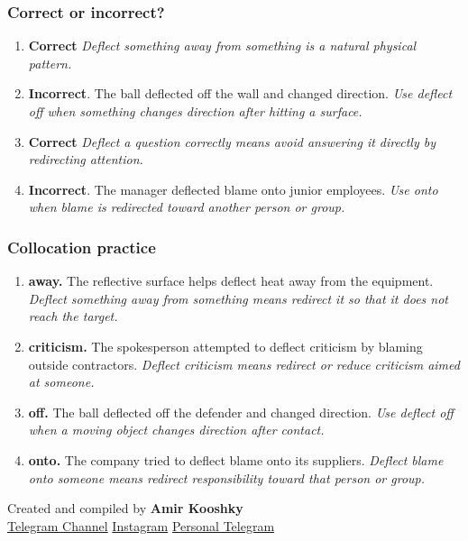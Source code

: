 \documentclass[11pt]{article}
\begin{document}
\subsubsection{Correct or incorrect?}
\begin{enumerate}
  \item \textbf{Correct} \emph{Deflect something away from something is a natural physical pattern.}
  \item \textbf{Incorrect}. The ball deflected off the wall and changed direction. \emph{Use deflect off when something changes direction after hitting a surface.}
  \item \textbf{Correct} \emph{Deflect a question correctly means avoid answering it directly by redirecting attention.}
  \item \textbf{Incorrect}. The manager deflected blame onto junior employees. \emph{Use onto when blame is redirected toward another person or group.}
\end{enumerate}

\subsubsection{Collocation practice}
\begin{enumerate}
  \item \textbf{away.} The reflective surface helps deflect heat away from the equipment. \emph{Deflect something away from something means redirect it so that it does not reach the target.}
  \item \textbf{criticism.} The spokesperson attempted to deflect criticism by blaming outside contractors. \emph{Deflect criticism means redirect or reduce criticism aimed at someone.}
  \item \textbf{off.} The ball deflected off the defender and changed direction. \emph{Use deflect off when a moving object changes direction after contact.}
  \item \textbf{onto.} The company tried to deflect blame onto its suppliers. \emph{Deflect blame onto someone means redirect responsibility toward that person or group.}
\end{enumerate}

\vfill
\begin{center}
\small\color{Muted} Created and compiled by \textbf{Amir Kooshky}\\
\href{https://t.me/KooshkyTOEFL}{Telegram Channel}\quad\textbullet\quad
\href{https://www.instagram.com/kooshkytoefl}{Instagram}\quad\textbullet\quad
\href{https://t.me/KooshkyTOEFL\_pv}{Personal Telegram}
\end{center}
\end{document}
